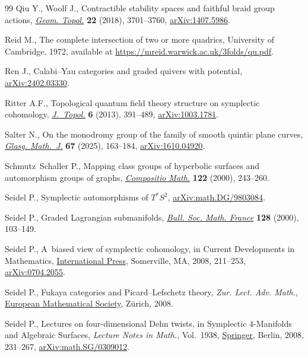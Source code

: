 \documentclass[pdftex]{sigma}
\theoremstyle{definition}
\numberwithin{equation}{section}
\begin{document}
\begin{thebibliography}{99}
Qiu Y., Woolf J., Contractible stability spaces and faithful braid group
 actions, \href{https://doi.org/10.2140/gt.2018.22.3701}{\textit{Geom.
 Topol.}} \textbf{22} (2018), 3701--3760,
 \href{http://arxiv.org/abs/1407.5986}{arXiv:1407.5986}.

Reid M., The complete intersection of two or more quadrics, {U}niversity of
 Cambridge, 1972, available at
 \url{https://mreid.warwick.ac.uk/3folds/qu.pdf}.

Ren J., Calabi--{Y}au categories and graded quivers with potential,
 \href{http://arxiv.org/abs/2402.03330}{arXiv:2402.03330}.

Ritter A.F., Topological quantum field theory structure on symplectic
 cohomology, \href{https://doi.org/10.1112/jtopol/jts038}{\textit{J.~Topol.}}
 \textbf{6} (2013), 391--489,
 \href{http://arxiv.org/abs/1003.1781}{arXiv:1003.1781}.

Salter N., On the monodromy group of the family of smooth quintic plane curves,
 \href{https://doi.org/10.1017/S0017089524000284}{\textit{Glasg. Math.~J.}}
 \textbf{67} (2025), 163--184,
 \href{http://arxiv.org/abs/1610.04920}{arXiv:1610.04920}.

Schmutz~Schaller P., Mapping class groups of hyperbolic surfaces and
 automorphism groups of graphs,
 \href{https://doi.org/10.1023/A:1002672721132}{\textit{Compositio Math.}}
 \textbf{122} (2000), 243--260.

Seidel P., Symplectic automorphisms of ${T}^*{S}^2$,
 \href{http://arxiv.org/abs/math.DG/9803084}{arXiv:math.DG/9803084}.


Seidel P., Graded {L}agrangian submanifolds,
 \href{https://doi.org/10.24033/bsmf.2365}{\textit{Bull. Soc. Math. France}}
 \textbf{128} (2000), 103--149.

Seidel P., A~biased view of symplectic cohomology, in Current Developments in
 Mathematics,
 \href{https://doi.org/10.4310/CDM.2006.v2006.n1.a4}{International Press},
 Somerville, MA, 2008, 211--253,
 \href{http://arxiv.org/abs/0704.2055}{arXiv:0704.2055}.

Seidel P., Fukaya categories and {P}icard--{L}efschetz theory, \textit{Zur. Lect. Adv.
 Math.}, \href{https://doi.org/10.4171/063}{European Mathematical Society},
 Z\"urich, 2008.

Seidel P., Lectures on four-dimensional {D}ehn twists, in Symplectic
 4-Manifolds and Algebraic Surfaces, \textit{Lecture Notes in Math.}, Vol.~1938, \href{https://doi.org/10.1007/978-3-540-78279-7_4}{Springer}, Berlin,
 2008, 231--267,
 \href{http://arxiv.org/abs/math.SG/0309012}{arXiv:math.SG/0309012}.


\end{thebibliography}
\end{document}
